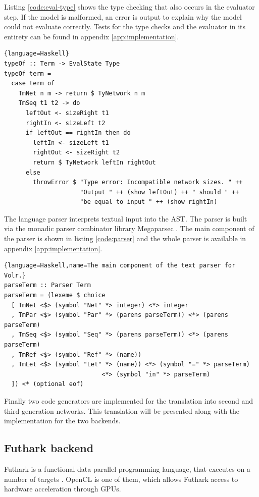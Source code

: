 Listing \ref{code:eval-type} shows the type checking
that also occurs in the evaluator step. 
If the model is malformed, an error is output to explain why the
model could not evaluate correctly.
Tests for the type checks and the evaluator in its entirety
can be found in appendix \ref{app:implementation}.

\lstset{caption=Part of the type checking code in Haskell.}
\begin{lstlisting}{language=Haskell}
typeOf :: Term -> EvalState Type
typeOf term = 
  case term of
    TmNet n m -> return $ TyNetwork n m
    TmSeq t1 t2 -> do
      leftOut <- sizeRight t1
      rightIn <- sizeLeft t2
      if leftOut == rightIn then do
        leftIn <- sizeLeft t1
        rightOut <- sizeRight t2
        return $ TyNetwork leftIn rightOut
      else
        throwError $ "Type error: Incompatible network sizes. " ++
                     "Output " ++ (show leftOut) ++ " should " ++
                     "be equal to input " ++ (show rightIn)
\end{lstlisting} \label{code:eval-type}

The language parser interprets textual input into the AST. 
The parser is built via the monadic parser combinator library Megaparsec
\cite{megaparsec}.
The main component of the parser is shown in listing \ref{code:parser}
and the whole parser is available in appendix \ref{app:implementation}.

\begin{lstlisting}{language=Haskell,name=The main component of the text parser for Volr.}
parseTerm :: Parser Term
parseTerm = (lexeme $ choice
  [ TmNet <$> (symbol "Net" *> integer) <*> integer
  , TmPar <$> (symbol "Par" *> (parens parseTerm)) <*> (parens parseTerm)
  , TmSeq <$> (symbol "Seq" *> (parens parseTerm)) <*> (parens parseTerm)
  , TmRef <$> (symbol "Ref" *> (name))
  , TmLet <$> (symbol "Let" *> (name)) <*> (symbol "=" *> parseTerm)
                           <*> (symbol "in" *> parseTerm)
  ]) <* (optional eof)
\end{lstlisting} \label{code:parser}

Finally two code generators are implemented for the translation into
second and third generation networks.
This translation will be presented along with the implementation
for the two backends.

\subsection{Futhark backend} \label{sec:volr-futhark}
Futhark is a functional data-parallel programming language, that
executes on a number of targets \autocite{Henriksen2017}.
\gls{OpenCL} is one of them, which allows Futhark access to 
hardware acceleration through \gls{GPU}s.

